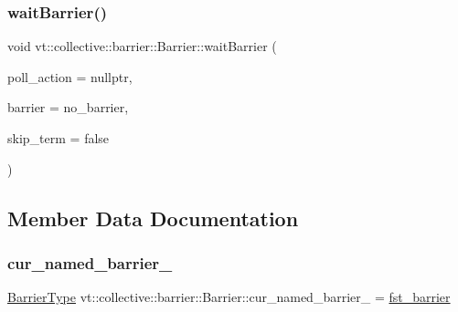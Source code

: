\subsubsection{\texorpdfstring{wait\+Barrier()}{waitBarrier()}}
{\footnotesize\ttfamily void vt\+::collective\+::barrier\+::\+Barrier\+::wait\+Barrier (\begin{DoxyParamCaption}\item[{\hyperlink{namespacevt_ae0a5a7b18cc99d7b732cb4d44f46b0f3}{Action\+Type}}]{poll\+\_\+action = {\ttfamily nullptr},  }\item[{\hyperlink{namespacevt_a25e481f0d6bbc7204db23d1c87a62e77}{Barrier\+Type} const \&}]{barrier = {\ttfamily no\+\_\+barrier},  }\item[{bool const}]{skip\+\_\+term = {\ttfamily false} }\end{DoxyParamCaption})\hspace{0.3cm}{\ttfamily [private]}}



\subsection{Member Data Documentation}
\mbox{\label{structvt_1_1collective_1_1barrier_1_1_barrier_ad3e45365fa6ddf4ca0e08e7f877a580a}} 
\subsubsection{\texorpdfstring{cur\+\_\+named\+\_\+barrier\+\_\+}{cur\_named\_barrier\_}}
{\footnotesize\ttfamily \hyperlink{namespacevt_a25e481f0d6bbc7204db23d1c87a62e77}{Barrier\+Type} vt\+::collective\+::barrier\+::\+Barrier\+::cur\+\_\+named\+\_\+barrier\+\_\+ = \hyperlink{namespacevt_1_1collective_1_1barrier_a43d35d830e81f62b5dfb571ce5e0939e}{fst\+\_\+barrier}\hspace{0.3cm}{\ttfamily [private]}}

\mbox{\label{structvt_1_1collective_1_1barrier_1_1_barrier_a19701ef650907899ae95d750343db5ac}} 
